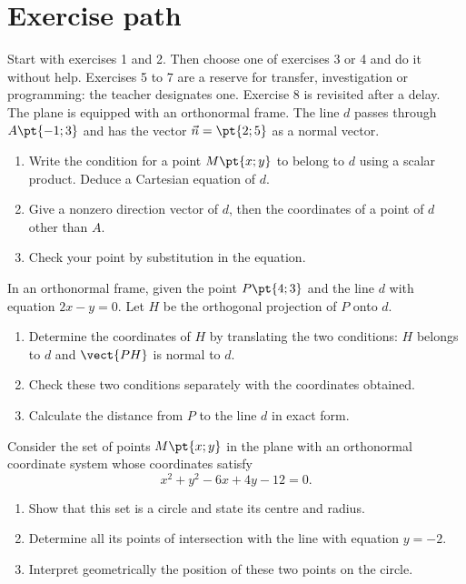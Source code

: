 \section*{Exercise path}\label{C07-PARC}
Start with exercises 1 and 2. Then choose one of exercises 3 or 4 and do it without help. Exercises 5 to 7 are a reserve for transfer, investigation or programming: the teacher designates one. Exercise 8 is revisited after a delay.
\begingroup
{}
The plane is equipped with an orthonormal frame. The line $d$ passes through $A\pt{-1;3}$ and has the vector $\vec n=\pt{2;5}$ as a normal vector.
\begin{enumerate}[label=\arabic*.]
\item Write the condition for a point $M\pt{x;y}$ to belong to $d$ using a scalar product. Deduce a Cartesian equation of $d$.
\item Give a nonzero direction vector of $d$, then the coordinates of a point of $d$ other than $A$.
\item Check your point by substitution in the equation.
\end{enumerate}
In an orthonormal frame, given the point $P\pt{4;3}$ and the line $d$ with equation $2x-y=0$. Let $H$ be the orthogonal projection of $P$ onto $d$.
\begin{enumerate}[label=\arabic*.]
\item Determine the coordinates of $H$ by translating the two conditions: $H$ belongs to $d$ and $\vect{PH}$ is normal to $d$.
\item Check these two conditions separately with the coordinates obtained.
\item Calculate the distance from $P$ to the line $d$ in exact form.
\end{enumerate}
Consider the set of points $M\pt{x;y}$ in the plane with an orthonormal coordinate system whose coordinates satisfy\[x^2+y^2-6x+4y-12=0.\]
\begin{enumerate}[label=\arabic*.]
\item Show that this set is a circle and state its centre and radius.
\item Determine all its points of intersection with the line with equation $y=-2$.
\item Interpret geometrically the position of these two points on the circle.
\end{enumerate}
